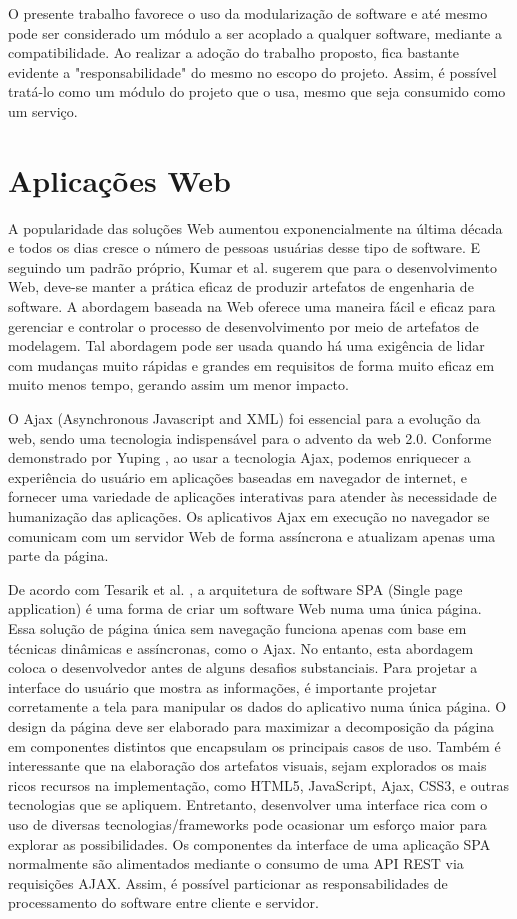 O presente trabalho favorece o uso da modularização de software e até mesmo pode ser considerado um módulo a ser acoplado a qualquer software, mediante a compatibilidade. Ao realizar a adoção do trabalho proposto, fica bastante evidente a "responsabilidade" do mesmo no escopo do projeto. Assim, é possível tratá-lo como um módulo do projeto que o usa, mesmo que seja consumido como um serviço.


\section{Aplicações Web}\label{sec:apps_web}


A popularidade das soluções Web aumentou exponencialmente na última década e todos os dias cresce o número de pessoas usuárias desse tipo de software. E seguindo um padrão próprio, Kumar et al. \citep{7813710} sugerem que para o desenvolvimento Web, deve-se manter a prática eficaz de produzir artefatos de engenharia de software. A abordagem baseada na Web oferece uma maneira fácil e eficaz para gerenciar e controlar o processo de desenvolvimento por meio de artefatos de modelagem. Tal abordagem pode ser usada quando há uma exigência de lidar com mudanças muito rápidas e grandes em requisitos de forma muito eficaz em muito menos tempo, gerando assim um menor impacto. 


O Ajax (Asynchronous Javascript and XML) foi essencial para a evolução da web, sendo uma tecnologia indispensável para o advento da web 2.0. Conforme demonstrado por Yuping \citep{6845605}, ao usar a tecnologia Ajax, podemos enriquecer a experiência do usuário em aplicações baseadas em navegador de internet, e fornecer uma variedade de aplicações interativas para atender às necessidade de humanização das aplicações.
Os aplicativos Ajax em execução no navegador se comunicam com um servidor Web de forma assíncrona e atualizam apenas uma parte da página.


De acordo com Tesarik et al. \citep{4664349}, a arquitetura de software SPA (Single page application) é uma forma de criar um software Web numa uma única página. Essa solução de página única sem navegação funciona apenas com base em técnicas dinâmicas e assíncronas, como o Ajax. No entanto, esta abordagem coloca o desenvolvedor antes de alguns desafios substanciais.
Para projetar a interface do usuário que mostra as informações, é importante projetar corretamente a tela para manipular os dados do aplicativo numa única página. O design da página deve ser elaborado para maximizar a decomposição da página em componentes distintos que encapsulam os principais casos de uso.
Também é interessante que na elaboração dos artefatos visuais, sejam explorados os mais ricos recursos na implementação, como HTML5, JavaScript, Ajax, CSS3, e outras tecnologias que se apliquem. Entretanto, desenvolver uma interface rica com o uso de diversas tecnologias/frameworks pode ocasionar um esforço maior para explorar as possibilidades.
Os componentes da interface de uma aplicação SPA normalmente são alimentados mediante o consumo de uma API REST via requisições AJAX. Assim, é possível particionar as responsabilidades de processamento do software entre cliente e servidor.


